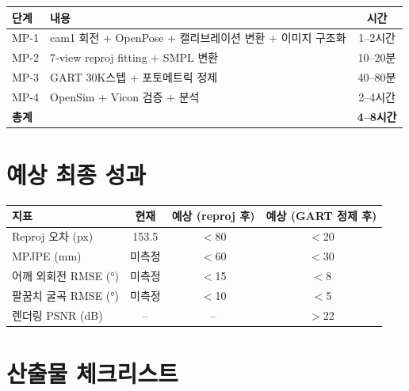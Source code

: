 \documentclass[11pt, a4paper]{report}
\begin{document}
\begin{center}
\renewcommand{\arraystretch}{1.3}
\begin{tabular}{llc}
\toprule
\textbf{단계} & \textbf{내용} & \textbf{시간} \\
\midrule
MP-1 & cam1 회전 + OpenPose + 캘리브레이션 변환 + 이미지 구조화 & 1--2시간 \\
MP-2 & 7-view reproj fitting + SMPL 변환 & 10--20분 \\
MP-3 & GART 30K스텝 + 포토메트릭 정제 & 40--80분 \\
MP-4 & OpenSim + Vicon 검증 + 분석 & 2--4시간 \\
\midrule
\textbf{총계} & & \textbf{4--8시간} \\
\bottomrule
\end{tabular}
\end{center}


\section{예상 최종 성과}

\begin{center}
\renewcommand{\arraystretch}{1.3}
\begin{tabular}{lccc}
\toprule
\textbf{지표} & \textbf{현재} & \textbf{예상 (reproj 후)} & \textbf{예상 (GART 정제 후)} \\
\midrule
Reproj 오차 (px) & 153.5 & $<$80 & $<$20 \\
MPJPE (mm) & 미측정 & $<$60 & $<$30 \\
어깨 외회전 RMSE (°) & 미측정 & $<$15 & $<$8 \\
팔꿈치 굴곡 RMSE (°) & 미측정 & $<$10 & $<$5 \\
렌더링 PSNR (dB) & -- & -- & $>$22 \\
\bottomrule
\end{tabular}
\end{center}


\section{산출물 체크리스트}
\end{document}

